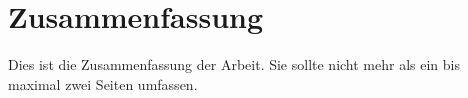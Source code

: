 \chapter*{Zusammenfassung}
\label{cha:zusammenfassung}

Dies ist die Zusammenfassung der Arbeit. Sie sollte nicht mehr als
ein bis maximal zwei Seiten umfassen.

